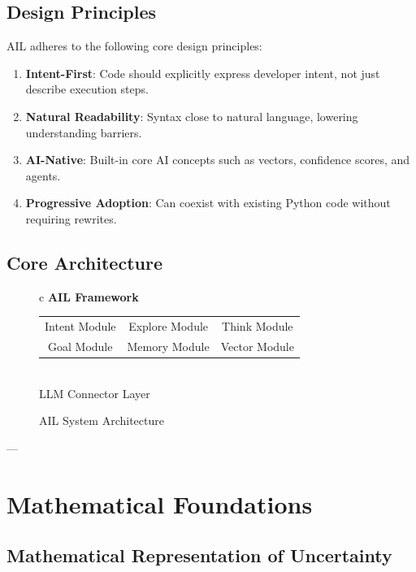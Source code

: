 \documentclass[12pt,a4paper]{article}
\begin{document}
\subsection{Design Principles}

AIL adheres to the following core design principles:

\begin{enumerate}
\item \textbf{Intent-First}: Code should explicitly express developer intent, not just describe execution steps.
\item \textbf{Natural Readability}: Syntax close to natural language, lowering understanding barriers.
\item \textbf{AI-Native}: Built-in core AI concepts such as vectors, confidence scores, and agents.
\item \textbf{Progressive Adoption}: Can coexist with existing Python code without requiring rewrites.
\end{enumerate}

\subsection{Core Architecture}

\begin{figure}[htbp]
\centering
\begin{tabular}{c}
\textbf{AIL Framework} \\
\hline
\begin{tabular}{ccc}
Intent Module & Explore Module & Think Module \\
Goal Module & Memory Module & Vector Module \\
\end{tabular}
\\
\hline
LLM Connector Layer \\
\end{tabular}
\caption{AIL System Architecture}
\end{figure}

---

\section{Mathematical Foundations}

\subsection{Mathematical Representation of Uncertainty}
\end{document}
